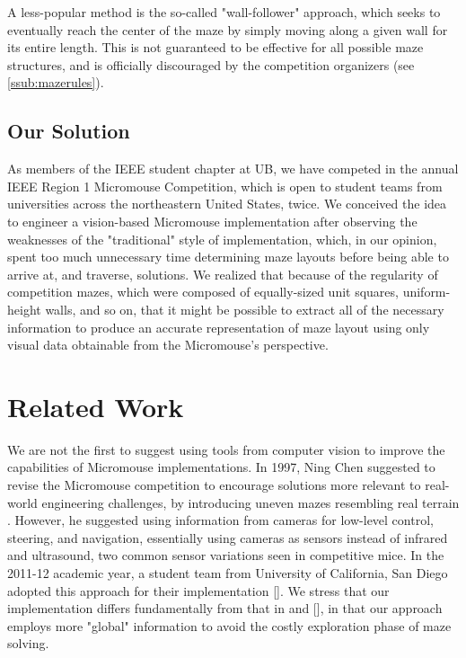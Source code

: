 \documentclass[10pt,twocolumn,letterpaper]{article}
\begin{document}
A less-popular method is the so-called "wall-follower" approach, which seeks to eventually reach the center of the maze
by simply moving along a given wall for its entire length.  This is not guaranteed to be effective for all possible maze
structures, and is officially discouraged by the competition organizers (see \textsection\ref{ssub:mazerules}).

\subsection{Our Solution}
\label{sub:oursolution}

As members of the IEEE student chapter at UB, we have competed in the annual IEEE Region 1 Micromouse Competition, which
is open to student teams from universities across the northeastern United States, twice.  We conceived the idea to
engineer a vision-based Micromouse implementation after observing the weaknesses of the "traditional" style of
implementation, which, in our opinion, spent too much unnecessary time determining maze layouts before being able to
arrive at, and traverse, solutions.  We realized that because of the regularity of competition mazes, which were
composed of equally-sized unit squares, uniform-height walls, and so on, that it might be possible to extract all of the
necessary information to produce an accurate representation of maze layout using only visual data obtainable from the
Micromouse's perspective.

\section{Related Work}
\label{sec:relatedwork}

We are not the first to suggest using tools from computer vision to improve the capabilities of Micromouse
implementations.  In 1997, Ning Chen suggested to revise the Micromouse competition to encourage solutions more relevant
to real-world engineering challenges, by introducing uneven mazes resembling real terrain \cite{Chen1997}.  However, he
suggested using information from cameras for low-level control, steering, and navigation, essentially using cameras as
sensors instead of infrared and ultrasound, two common sensor variations seen in competitive mice.  In the 2011-12
academic year, a student team from University of California, San Diego adopted this approach for their implementation
[].  We stress that our implementation differs fundamentally from that in \cite{Chen1997} and [], in that our approach
employs more "global" information to avoid the costly exploration phase of maze solving.
\end{document}
